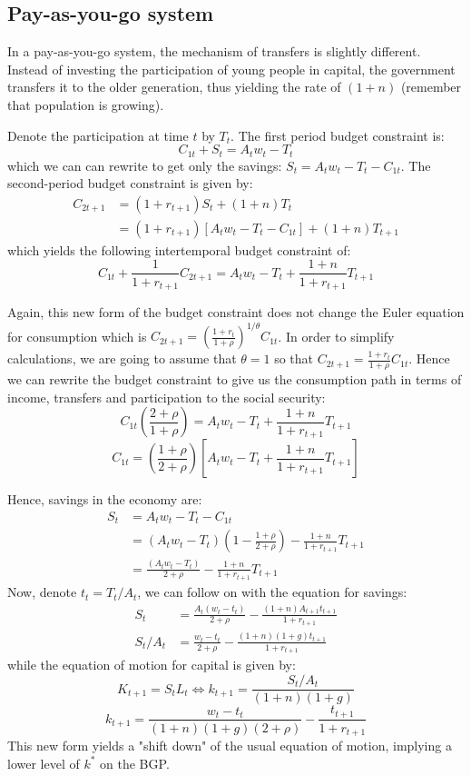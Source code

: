 \documentclass[12pt]{report}
\begin{document}
\subsection{Pay-as-you-go system}

In a pay-as-you-go system, the mechanism of transfers is slightly different. Instead of investing the participation of young people in capital, the government transfers it to the older generation, thus yielding the rate of $(1+n)$ (remember that population is growing).

Denote the participation at time $t$ by $T_t$. The first period budget constraint is: $$C_{1t} + S_t = A_t w_t - T_t $$ which we can can rewrite to get only the savings: $S_t = A_t w_t - T_t - C_{1t}$. The second-period budget constraint is given by: \begin{align*} C_{2t+1} & = (1+r_{t+1})S_t + (1+n)T_t \\
& = (1+r_{t+1})[A_t w_t - T_t - C_{1t}] + (1+n)T_{t+1}
\end{align*}
which yields the following intertemporal budget constraint of: $$ C_{1t} + \frac{1}{1+r_{t+1}} C_{2t+1} = A_t w_t - T_t + \frac{1 + n}{1+r_{t+1}} T_{t+1} $$

Again, this new form of the budget constraint does not change the Euler equation for consumption which is $C_{2t+1} = \left(\frac{1+r_t}{1+\rho}\right)^{1/\theta} C_{1t}$. In order to simplify calculations, we are going to assume that $\theta = 1$ so that $C_{2t+1} = \frac{1+r_t}{1+\rho} C_{1t}$. Hence we can rewrite the budget constraint to give us the consumption path in terms of income, transfers and participation to the social security: $$C_{1t} \left( \frac{2 + \rho}{1+\rho}\right) = A_t w_t - T_t + \frac{1 + n}{1+r_{t+1}} T_{t+1} $$ $$C_{1t}  = \left( \frac{1 + \rho}{2+\rho}\right)\left[A_t w_t - T_t + \frac{1 + n}{1+r_{t+1}} T_{t+1}\right] $$

Hence, savings in the economy are:\begin{align*}
S_t & = A_t w_t - T_t - C_{1t} \\
& = (A_t w_t - T_t)\left(1 - \frac{1 + \rho}{2+\rho}\right) - \frac{1 + n}{1+r_{t+1}} T_{t+1} \\
& = \frac{(A_t w_t - T_t)}{2+\rho} - \frac{1 + n}{1+r_{t+1}} T_{t+1} 
\end{align*} Now, denote $t_t = T_t/A_t$, we can follow on with the equation for savings: 
\begin{align*}
S_t & = \frac{A_t (w_t - t_t)}{2+\rho} - \frac{(1 + n)A_{t+1}t_{t+1}}{1+r_{t+1}} \\
S_t/A_t & = \frac{w_t - t_t}{2+\rho} - \frac{(1 + n)(1+g)t_{t+1}}{1+r_{t+1}}
\end{align*} 
while the equation of motion for capital is given by: $$K_{t+1} = S_tL_t \Leftrightarrow k_{t+1} = \frac{S_t/A_t}{(1+n)(1+g)} $$ 
$$
k_{t+1} = \frac{w_t - t_t}{(1+n)(1+g)(2+\rho)} - \frac{t_{t+1}}{1+ r_{t+1}}
$$
This new form yields a "shift down" of the usual equation of motion, implying a lower level of $k^*$ on the BGP.
\end{document}
